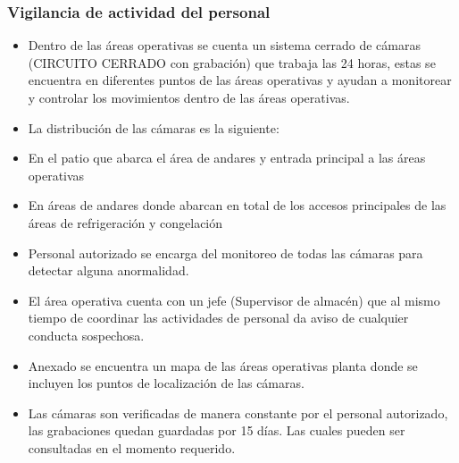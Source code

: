 \subsubsection{Vigilancia de actividad del personal}
\begin{itemize}
	\item Dentro de las áreas operativas se cuenta un sistema cerrado de cámaras (CIRCUITO CERRADO con grabación) que trabaja las 24 horas, estas se encuentra en diferentes puntos de las áreas operativas y ayudan a monitorear y controlar los movimientos dentro de las áreas operativas.
	\item La distribución de las cámaras es la siguiente:
	\item En el patio que abarca el área de andares y entrada principal a las áreas operativas
	\item En áreas de andares donde abarcan en total de los accesos principales de las áreas de refrigeración y congelación
	\item Personal autorizado se encarga del monitoreo de todas las cámaras para detectar alguna anormalidad.
	\item El área operativa cuenta con un jefe (Supervisor de almacén) que al mismo tiempo de coordinar las actividades de personal da aviso de cualquier conducta sospechosa.
	\item Anexado se encuentra un mapa de las áreas operativas planta donde se incluyen los puntos de localización de las cámaras.
	\item Las cámaras son verificadas de manera constante por el personal autorizado, las grabaciones quedan guardadas por 15 días. Las cuales pueden ser consultadas en el momento requerido.
\end{itemize}

